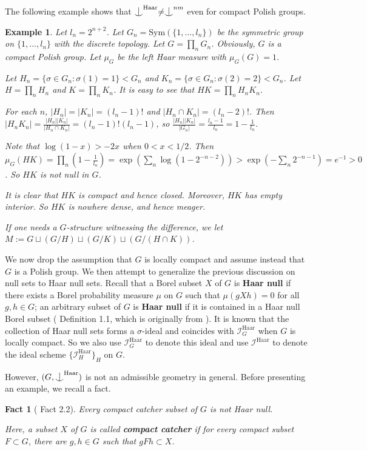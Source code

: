 \documentclass{article}
\newtheorem{example}[definition]{Example}
\newtheorem{fact}[definition]{Fact}
\newcommand{\I}{\mathcal{I}}
\newcommand{\HH}{\mathrm{Haar}}
\newcommand{\Sym}{\mathrm{Sym}}
\newcommand{\ind}{\mathrel{\raise0.2ex\hbox{\ooalign{\hidewidth$\vert$\hidewidth\cr\raise-0.9ex\hbox{$\smile$}}}}}
\begin{document}
The following example shows that $\ind^\HH\neq \ind^{nm}$ even for compact Polish groups.

\begin{example}
Let $l_n=2^{n+2}$. Let $G_n=\Sym(\{1,\dots,l_n\})$ be the symmetric group on $\{1,\dots,l_n\}$ with the discrete topology. Let $G=\prod_n G_n$. Obviously, $G$ is a compact Polish group.
Let $\mu_G$ be the left Haar measure with $\mu_G(G)=1$.

Let $H_n=\{\sigma\in G_n:\sigma(1)=1\}<G_n$ and $K_n=\{\sigma\in G_n:\sigma(2)=2\}<G_n$. Let $H=\prod_nH_n$ and $K=\prod_n K_n$. It is easy to see that $HK=\prod_n H_nK_n$.

For each $n$, $|H_n|=|K_n|=(l_n-1)!$ and $|H_n\cap K_n|=(l_n-2)!$. Then $|H_nK_n|=\frac{|H_n||K_n|}{|H_n\cap K_n|}=(l_n-1)!(l_n-1)$, so $\frac{|H_n||K_n|}{|G_n|}=\frac{l_n-1}{l_n}=1-\frac{1}{l_n}$.

Note that $\log(1-x)>-2x$ when $0<x<1/2$.
Then $\mu_G(HK)=\prod_n(1-\frac{1}{l_n})=\exp(\sum_n\log(1-2^{-n-2}))>\exp(-\sum_n 2^{-n-1})=e^{-1}>0$. So $HK$ is not null in $G$.

It is clear that $HK$ is compact and hence closed. Moreover, $HK$ has empty interior. So $HK$ is nowhere dense, and hence meager.

If one needs a $G$-structure witnessing the difference, we let $M:=G\sqcup (G/H)\sqcup (G/K)\sqcup(G/(H\cap K))$.
\end{example}

We now drop the assumption that 
$G$ is locally compact and assume instead that 
$G$ is a Polish group. We then attempt to generalize the previous discussion on null sets to Haar null sets. Recall that a Borel subset $X$ of $G$ is \textbf{Haar null} if there exists a Borel probability measure  $\mu$ on $G$ such that  $\mu(gXh)=0$ for all $g,h\in G$; an arbitrary subset of $G$ is \textbf{Haar null} if it is contained in a Haar null Borel subset (\cite{Haar-null} Definition 1.1, which is originally from \cite{C-Haar}). It is known that the collection of Haar null sets forms a $\sigma$-ideal and coincides with $\I^\HH_G$ when $G$ is locally compact. So we also use $\I^\HH_G$ to denote this ideal and use $\I^\HH$ to denote the ideal scheme $\{\I^\HH_H\}_H$ on $G$. 

However, $(G, \ind^\HH)$ is not an admissible geometry in general. Before presenting an example, we recall a fact.

\begin{fact}[\cite{Haar-null} Fact 2.2]\label{compact-cat}
Every compact catcher subset of $G$ is not Haar null.

Here, a subset $X$ of $G$ is called \textbf{compact catcher} if for every compact subset $F\subset G$, there are $g,h\in G$ such that $gFh\subset X$. 
\end{fact}
\end{document}
